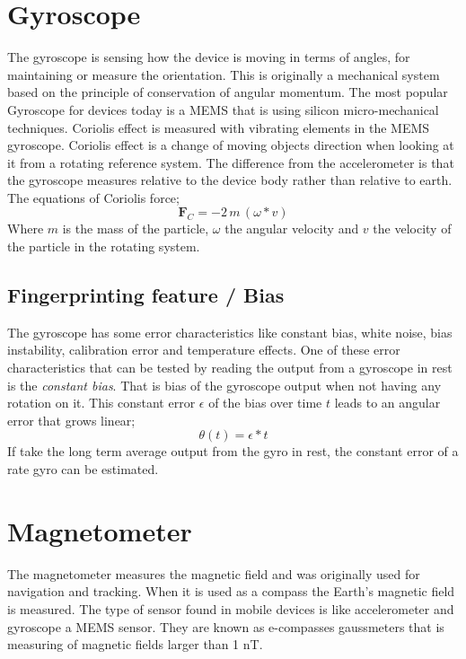 \section{Gyroscope}\label{sec:gyroscope}
The gyroscope is sensing how the device is moving in terms of angles, for maintaining or measure the orientation. This is originally  a mechanical system based on the principle of conservation of angular momentum. The most popular Gyroscope for devices today is a MEMS that is using silicon micro-mechanical techniques. Coriolis effect is measured with vibrating elements in the MEMS gyroscope. Coriolis effect is a change of moving objects direction when looking at it from a rotating reference system. The difference from the accelerometer is that the gyroscope measures relative to the device body rather than relative to earth. The equations of Coriolis force;  
$$\boldsymbol{ F}_C = -2 \, m \, (\omega *  v)$$
Where $m$ is the mass of the particle, $\omega$ the angular velocity and $v$ the velocity of the particle in the rotating system. 
\cite[]{sensor:inertialNav}
\subsection{Fingerprinting feature / Bias}
The gyroscope has some error characteristics like constant bias, white noise, bias instability, calibration error and temperature effects. One of these error characteristics that can be tested by reading the output from a gyroscope in rest is the \textit{constant bias}. That is bias of the gyroscope output when not having any rotation on it. This constant error $\epsilon$ of the bias over time $t$ leads to an angular error that grows linear; 
\begin{equation} \label{eq:gyroBias}
\theta (t)= \epsilon * t
\end{equation}
If take the long term average output from the gyro in rest, the constant error of a rate gyro can be estimated.\cite[]{sensors:fusion}


\section{Magnetometer}
The magnetometer measures the magnetic field and was originally used for navigation and tracking. When it is used as a compass the Earth's magnetic field is measured. The type of sensor found in mobile devices is like accelerometer and gyroscope a MEMS sensor. They are known as e-compasses gaussmeters that is measuring of magnetic fields larger than 1 nT.
~\cite[]{sensor:magn}

